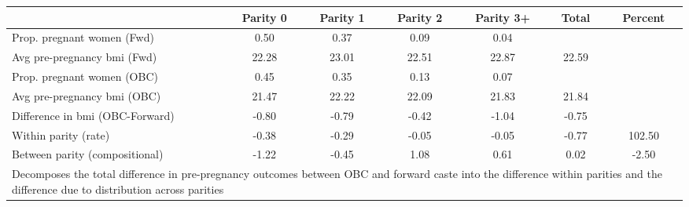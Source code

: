 \begin{tabular}{l*{6}{c}}
\toprule
            &\multicolumn{1}{c}{Parity 0}&\multicolumn{1}{c}{Parity 1}&\multicolumn{1}{c}{Parity 2}&\multicolumn{1}{c}{Parity 3+}&\multicolumn{1}{c}{Total}&\multicolumn{1}{c}{Percent}\\
\midrule
\midrule
Prop. pregnant women (Fwd)&        0.50&        0.37&        0.09&        0.04&            &            \\
Avg pre-pregnancy bmi (Fwd)&       22.28&       23.01&       22.51&       22.87&       22.59&            \\
Prop. pregnant women (OBC)&        0.45&        0.35&        0.13&        0.07&            &            \\
Avg pre-pregnancy bmi (OBC)&       21.47&       22.22&       22.09&       21.83&       21.84&            \\
Difference in bmi (OBC-Forward)&       -0.80&       -0.79&       -0.42&       -1.04&       -0.75&            \\
Within parity (rate)&       -0.38&       -0.29&       -0.05&       -0.05&       -0.77&      102.50\\
Between parity (compositional)&       -1.22&       -0.45&        1.08&        0.61&        0.02&       -2.50\\
\bottomrule
\multicolumn{7}{l}{\footnotesize Decomposes the total difference in pre-pregnancy outcomes between OBC and forward caste into the difference within parities and the difference due to distribution across parities}\\
\end{tabular}
